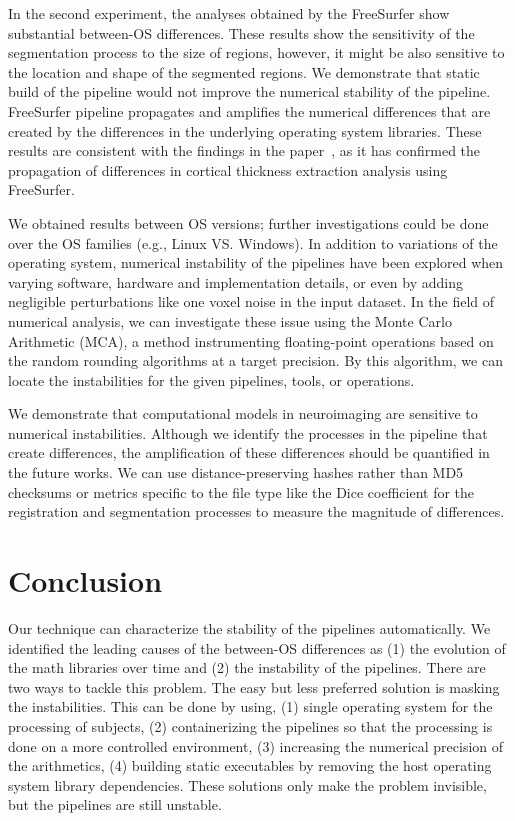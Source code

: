 \documentclass[a4paper,num-refs]{oup-contemporary}
\begin{document}
In the second experiment, 
the analyses obtained by the FreeSurfer show substantial between-OS differences.
These results show the sensitivity of the segmentation process to the 
size of regions, however, it might be also sensitive to the location and shape of 
the segmented regions.
We demonstrate that static build of the pipeline would not improve the numerical stability of the pipeline. 
FreeSurfer pipeline propagates and amplifies the numerical differences that are created by the 
differences in the underlying operating system libraries.
These results are consistent with the findings in the paper~\cite{Glatard2015}, 
as it has confirmed the propagation of differences in cortical thickness extraction analysis using FreeSurfer.

We obtained results between OS versions; further investigations could be done over the OS families (e.g., Linux VS. Windows).
In addition to variations of the operating system, numerical instability of the pipelines have been 
explored when varying software, hardware and implementation details, or even by adding negligible 
perturbations like one voxel noise in the input dataset.
In the field of numerical analysis, we can investigate these issue using the Monte Carlo Arithmetic (MCA), 
a method instrumenting floating-point operations based on the random rounding algorithms at a target precision.
By this algorithm, we can locate the instabilities for the given pipelines, tools, or operations.

We demonstrate that computational models in neuroimaging are sensitive to numerical instabilities. 
Although we identify the processes in the pipeline that create differences, 
the amplification of these differences should be quantified in the future works.
We can use distance-preserving hashes rather than MD5 checksums or metrics specific to the file type like the Dice coefficient 
for the registration and segmentation processes to measure the magnitude of differences. 


\section{Conclusion}

Our technique can characterize the stability of the pipelines
automatically. We identified the leading causes of the between-OS differences as (1) the evolution 
of the math libraries over time and (2) the instability of the pipelines. 
There are two ways to tackle this problem. The easy but less preferred solution is masking the instabilities.
This can be done by using, (1) single operating system for the processing of subjects, 
(2) containerizing the pipelines so that the 
processing is done on a more controlled environment, 
(3) increasing the numerical precision of the arithmetics, 
(4) building static executables by removing the host operating system library dependencies. 
These solutions only make the problem invisible, but the pipelines are still unstable.
\end{document}
